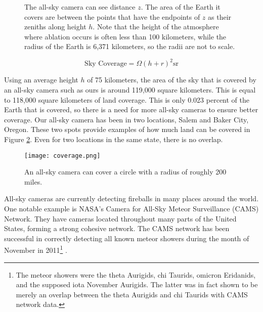 \begin{figure}[ht!]
	\centering
	\caption{The all-sky camera can see distance $z$. The area of the Earth it covers are between the points that have the endpoints of $z$ as their zeniths along height $h$. Note that the height of the atmosphere where ablation occurs is often less than 100 kilometers, while the radius of the Earth is 6,371 kilometers, so the radii are not to scale.}
	\label{fig:atmosphere}
\end{figure}


\begin{equation} \label{eq:coverage}
	\textrm{Sky Coverage} = \Omega(h+r)^2 \textrm{sr}
\end{equation}

Using an average height $h$ of 75 kilometers, the area of the sky that is covered by an all-sky camera such as ours is around 119,000 square kilometers. This is equal to 118,000 square kilometers of land coverage. This is only 0.023 percent of the Earth that is covered, so there is a need for more all-sky cameras to ensure better coverage. Our all-sky camera has been in two locations, Salem and Baker City, Oregon. These two spots provide examples of how much land can be covered in Figure \ref{fig:coverage}. Even for two locations in the same state, there is no overlap.

\begin{figure}[ht!]
	\centering
	\texttt{[image: coverage.png]}
	\caption{An all-sky camera can cover a circle with a radius of roughly 200 miles.}
	\label{fig:coverage}
\end{figure}


All-sky cameras are currently detecting fireballs in many places around the world. One notable example is NASA's Camera for All-Sky Meteor Surveillance (CAMS) Network. They have cameras located throughout many parts of the United States, forming a strong cohesive network. The CAMS network has been successful in correctly detecting all known meteor showers during the month of November in 2011\footnote{The meteor showers were the theta Aurigids, chi Taurids, omicron Eridanids, and the supposed iota November Aurigids. The latter was in fact shown to be merely an overlap between the theta Aurigids and chi Taurids with CAMS network data.} \cite{Jenniskens2011}.

